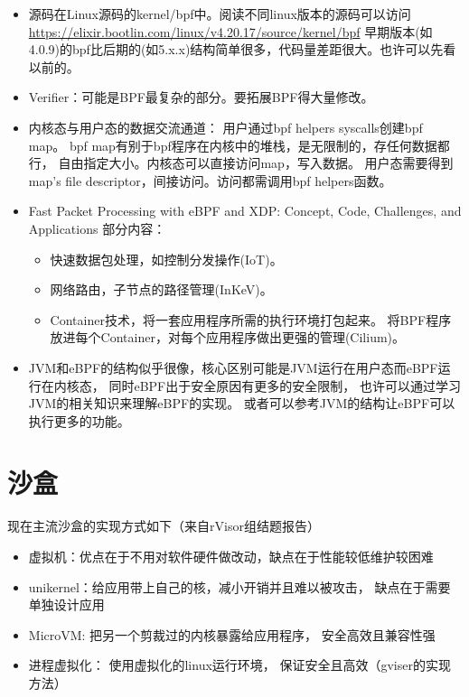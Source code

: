 \documentclass[AutoFakeBold,a4paper]{ctexart}
\begin{document}
\begin{itemize}
    \item 源码在Linux源码的kernel/bpf中。阅读不同linux版本的源码可以访问
    \url{https://elixir.bootlin.com/linux/v4.20.17/source/kernel/bpf}
    早期版本(如4.0.9)的bpf比后期的(如5.x.x)结构简单很多，代码量差距很大。也许可以先看以前的。
    \item Verifier：可能是BPF最复杂的部分。要拓展BPF得大量修改。
    \item 内核态与用户态的数据交流通道：
    用户通过bpf helpers syscalls创建bpf map。
    bpf map有别于bpf程序在内核中的堆栈，是无限制的，存任何数据都行，
    自由指定大小。内核态可以直接访问map，写入数据。
    用户态需要得到map's file descriptor，间接访问。访问都需调用bpf helpers函数。
    \item Fast Packet Processing with eBPF and XDP: 
    Concept, Code, Challenges, and Applications 部分内容：
    \begin{itemize}
        \item 快速数据包处理，如控制分发操作(IoT)。
        \item 网络路由，子节点的路径管理(InKeV)。
        \item Container技术，将一套应用程序所需的执行环境打包起来。
        将BPF程序放进每个Container，对每个应用程序做出更强的管理(Cilium)。
    \end{itemize}
    \item JVM和eBPF的结构似乎很像，核心区别可能是JVM运行在用户态而eBPF运行在内核态，
    同时eBPF出于安全原因有更多的安全限制，
    也许可以通过学习JVM的相关知识来理解eBPF的实现。
    或者可以参考JVM的结构让eBPF可以执行更多的功能。
\end{itemize}

\section{沙盒}

现在主流沙盒的实现方式如下（来自rVisor组结题报告）

\begin{itemize}
    \item 虚拟机：优点在于不用对软件硬件做改动，缺点在于性能较低维护较困难
    \item unikernel：给应用带上自己的核，减小开销并且难以被攻击，
    缺点在于需要单独设计应用
    \item MicroVM: 把另一个剪裁过的内核暴露给应用程序，
    安全高效且兼容性强
    \item 进程虚拟化：
    使用虚拟化的linux运行环境，
    保证安全且高效（gviser的实现方法）
\end{itemize}
\end{document}
